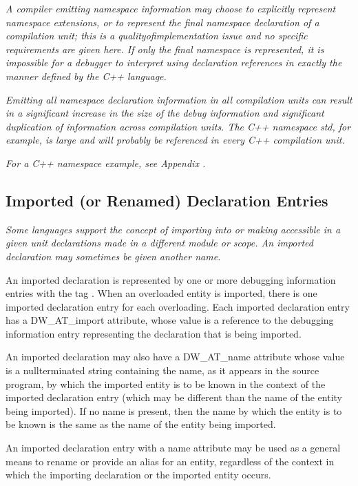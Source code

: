 \textit{A compiler emitting namespace information may choose to
explicitly represent namespace extensions, or to represent the
final namespace declaration of a compilation unit; this is a
quality\dash of\dash implementation issue and no specific requirements
are given here. If only the final namespace is represented,
it is impossible for a debugger to interpret using declaration
references in exactly the manner defined by the C++ language.
}

\textit{Emitting all namespace declaration information in all
compilation units can result in a significant increase in the
size of the debug information and significant duplication of
information across compilation units. The C++ namespace std,
for example, is large and will probably be referenced in
every C++ compilation unit.
}

\textit{For a C++ namespace example, see Appendix .
}



\subsection{Imported (or Renamed) Declaration Entries} 
\label{chap:importedorrenameddeclarationentries}
\textit{Some languages support the concept of importing into or making
accessible in a given unit declarations made in a different
module or scope. An imported declaration may sometimes be
given another name.
}

An imported declaration is represented by one or
more debugging information entries with the 
tag . 
When an overloaded entity
is imported, there is one imported declaration entry for
each overloading. Each imported declaration entry has a
DW\_AT\_import attribute, whose value is a reference to the
debugging information entry representing the declaration that
is being imported.

An imported declaration may also have a DW\_AT\_name attribute
whose value is a null\dash terminated string containing the
name, as it appears in the source program, by which the
imported entity is to be known in the context of the imported
declaration entry (which may be different than the name of
the entity being imported). If no name is present, then the
name by which the entity is to be known is the same as the
name of the entity being imported.

An imported declaration entry with a name attribute may be
used as a general means to rename or provide an alias for
an entity, regardless of the context in which the importing
declaration or the imported entity occurs.

